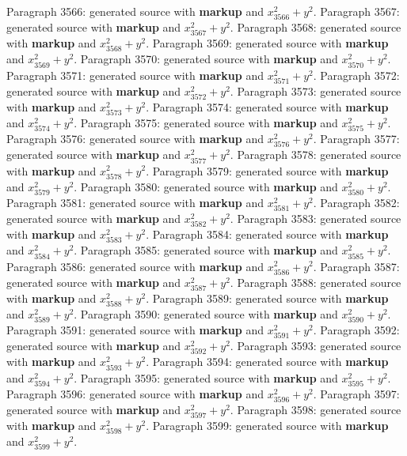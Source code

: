 \documentclass{article}
\begin{document}
Paragraph 3566: generated source with \textbf{markup} and $x_{3566}^2 + y^2$.
Paragraph 3567: generated source with \textbf{markup} and $x_{3567}^2 + y^2$.
Paragraph 3568: generated source with \textbf{markup} and $x_{3568}^2 + y^2$.
Paragraph 3569: generated source with \textbf{markup} and $x_{3569}^2 + y^2$.
Paragraph 3570: generated source with \textbf{markup} and $x_{3570}^2 + y^2$.
Paragraph 3571: generated source with \textbf{markup} and $x_{3571}^2 + y^2$.
Paragraph 3572: generated source with \textbf{markup} and $x_{3572}^2 + y^2$.
Paragraph 3573: generated source with \textbf{markup} and $x_{3573}^2 + y^2$.
Paragraph 3574: generated source with \textbf{markup} and $x_{3574}^2 + y^2$.
Paragraph 3575: generated source with \textbf{markup} and $x_{3575}^2 + y^2$.
Paragraph 3576: generated source with \textbf{markup} and $x_{3576}^2 + y^2$.
Paragraph 3577: generated source with \textbf{markup} and $x_{3577}^2 + y^2$.
Paragraph 3578: generated source with \textbf{markup} and $x_{3578}^2 + y^2$.
Paragraph 3579: generated source with \textbf{markup} and $x_{3579}^2 + y^2$.
Paragraph 3580: generated source with \textbf{markup} and $x_{3580}^2 + y^2$.
Paragraph 3581: generated source with \textbf{markup} and $x_{3581}^2 + y^2$.
Paragraph 3582: generated source with \textbf{markup} and $x_{3582}^2 + y^2$.
Paragraph 3583: generated source with \textbf{markup} and $x_{3583}^2 + y^2$.
Paragraph 3584: generated source with \textbf{markup} and $x_{3584}^2 + y^2$.
Paragraph 3585: generated source with \textbf{markup} and $x_{3585}^2 + y^2$.
Paragraph 3586: generated source with \textbf{markup} and $x_{3586}^2 + y^2$.
Paragraph 3587: generated source with \textbf{markup} and $x_{3587}^2 + y^2$.
Paragraph 3588: generated source with \textbf{markup} and $x_{3588}^2 + y^2$.
Paragraph 3589: generated source with \textbf{markup} and $x_{3589}^2 + y^2$.
Paragraph 3590: generated source with \textbf{markup} and $x_{3590}^2 + y^2$.
Paragraph 3591: generated source with \textbf{markup} and $x_{3591}^2 + y^2$.
Paragraph 3592: generated source with \textbf{markup} and $x_{3592}^2 + y^2$.
Paragraph 3593: generated source with \textbf{markup} and $x_{3593}^2 + y^2$.
Paragraph 3594: generated source with \textbf{markup} and $x_{3594}^2 + y^2$.
Paragraph 3595: generated source with \textbf{markup} and $x_{3595}^2 + y^2$.
Paragraph 3596: generated source with \textbf{markup} and $x_{3596}^2 + y^2$.
Paragraph 3597: generated source with \textbf{markup} and $x_{3597}^2 + y^2$.
Paragraph 3598: generated source with \textbf{markup} and $x_{3598}^2 + y^2$.
Paragraph 3599: generated source with \textbf{markup} and $x_{3599}^2 + y^2$.
\end{document}
